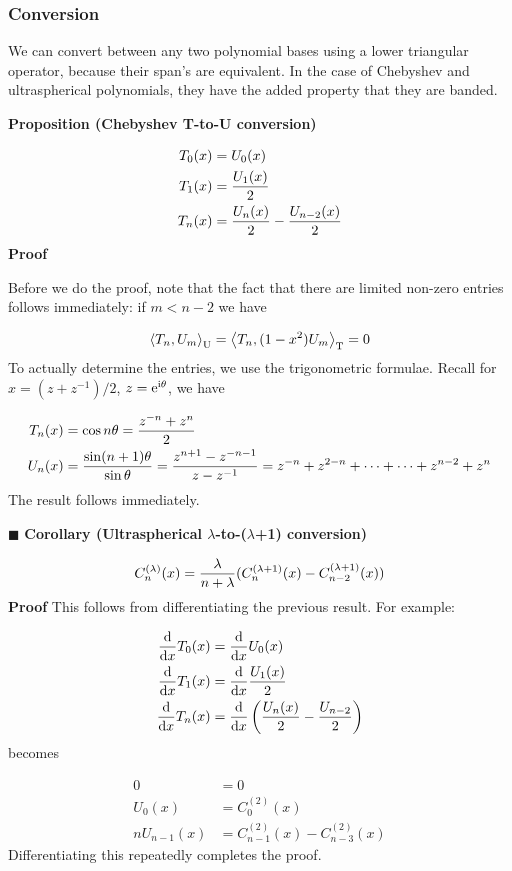 \documentclass[12pt,landscape]{article}
\def\D{ {\rm d} }
\def\I{ {\rm i} }
\def\E{ {\rm e} }
\def\ip<#1>{\left\langle{#1}\right\rangle}
\def\dx{\D x}
\begin{document}
{\newpage
\subsubsection{Conversion}
We can convert between any two polynomial bases using a lower triangular operator, because their span's are equivalent. In the case of Chebyshev and ultraspherical polynomials, they have the added property that they are banded.

\textbf{Proposition (Chebyshev T-to-U conversion)}


\begin{align*}
 T_0(x) &= U_0(x) \\
 T_1(x) &= {U_1(x) \over 2} \\
 T_n(x) &= {U_n(x) \over 2} - {U_{n-2}(x) \over 2}
\end{align*}
\newpage
\textbf{Proof}

Before we do the proof, note that the fact that there are limited non-zero entries follows immediately: if $m < n-2$ we have

\[
\ip<T_n, U_m>_{\rm U} = \ip<T_n, (1-x^2)U_m>_{\rm T} = 0
\]
To actually determine the entries, we use the trigonometric formulae. Recall for $x = (z + z^{-1})/2$, $z = \E^{\I \theta}$, we have


\begin{align*}
T_n(x) &= \cos n \theta = {z^{-n} + z^n \over 2}\\
U_n(x) &= {\sin (n+1) \theta \over \sin \theta} = {z^{n+1} - z^{-n-1} \over z - z^{-1}} = z^{-n} + z^{2-n} + \cdots +  \cdots + z^{n-2} + z^n
\end{align*}
The result follows immediately.

\ensuremath{\blacksquare}
\newpage
\textbf{Corollary (Ultraspherical \ensuremath{\lambda}-to-(\ensuremath{\lambda}+1) conversion)}

\[
C_n^{(\lambda)}(x) = {\lambda \over n+ \lambda} (C_n^{(\lambda+1)}(x) - C_{n-2}^{(\lambda+1)}(x))
\]
\textbf{Proof} This follows from differentiating the previous result. For example:


\begin{align*}
 {\D\over \dx} T_0(x) &= {\D\over \dx} U_0(x) \\
 {\D\over \dx} T_1(x) &= {\D\over \dx} {U_1(x) \over 2} \\
{\D\over \dx} T_n(x) &= {\D\over \dx} \left({U_n(x) \over 2} - {U_{n-2} \over 2} \right)
\end{align*}
becomes


\begin{align*}
    0 &= 0\\
    U_0(x) &= C_0^{(2)}(x) \\
   n U_{n-1}(x) &= C_{n-1}^{(2)}(x)  - C_{n-3}^{(2)}(x)
\end{align*}
Differentiating this repeatedly completes the proof.

}
\end{document}
